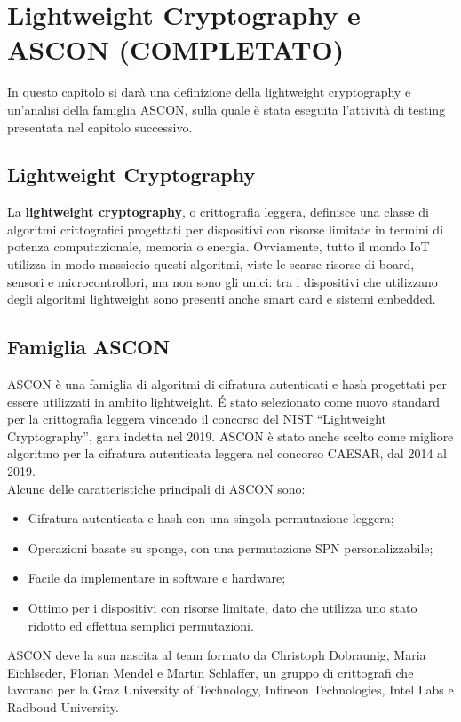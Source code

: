 \chapter{Lightweight Cryptography e ASCON (COMPLETATO)}

In questo capitolo si darà una definizione della lightweight cryptography e un'analisi della famiglia ASCON, sulla quale è stata eseguita l'attività di testing presentata nel capitolo successivo.

\section{Lightweight Cryptography}

La \textbf{lightweight cryptography}, o crittografia leggera, definisce una classe di algoritmi crittografici progettati per dispositivi con risorse limitate in termini di potenza computazionale, memoria o energia. Ovviamente, tutto il mondo IoT utilizza in modo massiccio questi algoritmi, viste le scarse risorse di board, sensori e microcontrollori, ma non sono gli unici: tra i dispositivi che utilizzano degli algoritmi lightweight sono presenti anche smart card e sistemi embedded.

\section{Famiglia ASCON}

ASCON è una famiglia di algoritmi di cifratura autenticati e hash progettati per essere utilizzati in ambito lightweight. É stato selezionato come nuovo standard per la crittografia leggera vincendo il concorso del NIST ``Lightweight Cryptography'', gara indetta nel 2019. ASCON è stato anche scelto come migliore algoritmo per la cifratura autenticata leggera nel concorso CAESAR, dal 2014 al 2019\cite{ascon-overview}. \\

\noindent Alcune delle caratteristiche principali di ASCON sono:
\begin{itemize}
    \item Cifratura autenticata e hash con una singola permutazione leggera;
    \item Operazioni basate su sponge, con una permutazione SPN personalizzabile;
    \item Facile da implementare in software e hardware;
    \item Ottimo per i dispositivi con risorse limitate, dato che utilizza uno stato ridotto ed effettua semplici permutazioni.
\end{itemize}
ASCON deve la sua nascita al team formato da Christoph Dobraunig, Maria Eichlseder, Florian Mendel e Martin Schläffer\cite{ascon-contact}, un gruppo di crittografi che lavorano per la Graz University of Technology, Infineon Technologies, Intel Labs e Radboud University\cite{ascon-overview}.

